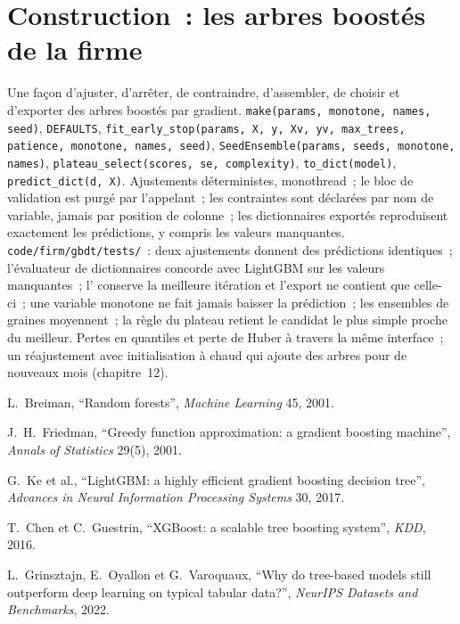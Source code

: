 \section{Construction~: les arbres boostés de la firme}\label{bld:ml:trees-and-boosting:gbdt}

\begin{build}
 Une façon d'ajuster, d'arrêter, de contraindre, d'assembler, de choisir et d'exporter des arbres boostés par gradient.
 \texttt{make(params, monotone, names, seed)}, \texttt{DEFAULTS},
\texttt{fit\_early\_stop(params, X, y, Xv, yv, max\_trees, patience, monotone, names, seed)}, \texttt{SeedEnsemble(params, seeds, monotone, names)},
\texttt{plateau\_select(scores, se, complexity)}, \texttt{to\_dict(model)}, \texttt{predict\_dict(d, X)}.
 Ajustements déterministes, monothread~; le bloc de validation est purgé par l'appelant~; les contraintes sont
déclarées par nom de variable, jamais par position de colonne~; les dictionnaires exportés reproduisent exactement les prédictions, y compris
les valeurs manquantes.
 \texttt{code/firm/gbdt/tests/}~: deux ajustements donnent des prédictions identiques~; l'évaluateur de dictionnaires
concorde avec LightGBM sur les valeurs manquantes~; l' conserve la meilleure itération et l'export ne contient que celle-ci~; une variable monotone
ne fait jamais baisser la prédiction~; les ensembles de graines moyennent~; la règle du plateau retient le candidat le plus simple proche du meilleur.
 Pertes en quantiles et perte de Huber à travers la même interface~; un réajustement avec initialisation à chaud qui ajoute des arbres pour de nouveaux
mois (chapitre~12).
\end{build}

\begin{omsources}
\item L.~Breiman, ``Random forests'', \emph{Machine Learning} 45, 2001.
\item J.~H.~Friedman, ``Greedy function approximation: a gradient boosting machine'', \emph{Annals of Statistics} 29(5),
2001.
\item G.~Ke et al., ``LightGBM: a highly efficient gradient boosting decision tree'', \emph{Advances in Neural Information
Processing Systems} 30, 2017.
\item T.~Chen et C.~Guestrin, ``XGBoost: a scalable tree boosting system'', \emph{KDD}, 2016.
\item L.~Grinsztajn, E.~Oyallon et G.~Varoquaux, ``Why do tree-based models still outperform deep learning on typical
tabular data?'', \emph{NeurIPS Datasets and Benchmarks}, 2022.
\end{omsources}

